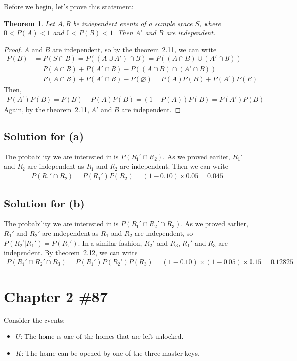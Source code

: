 \documentclass{scrartcl}
\newtheorem{theorem}{Theorem}
\begin{document}
Before we begin, let's prove this statement:
\begin{theorem}
  Let \(A, B\) be independent events of a sample space \(S\), where
  \(0 < P(A) < 1\) and \(0 < P(B) < 1\). Then \(A'\) and \(B\) are independent.
\end{theorem}
\begin{proof}
  \(A\) and \(B\) are independent, so by the theorem~2.11, we can write
  \begin{align*}
    P(B)
    &= P(S \cap B)
    = P((A \cup A') \cap B)
    = P((A \cap B) \cup (A' \cap B)) \\
    &= P(A \cap B) + P(A' \cap B) - P((A \cap B) \cap (A' \cap B)) \\
    &= P(A \cap B) + P(A' \cap B) - P(\varnothing)
    = P(A)P(B) + P(A')P(B)
  \end{align*}
  Then,
  \begin{align*}
    P(A')P(B) = P(B) - P(A)P(B) = (1 - P(A))P(B) = P(A')P(B)
  \end{align*}
  Again, by the theorem~2.11, \(A'\) and \(B\) are independent.
\end{proof}

\subsection{Solution for (a)}
The probability we are interested in is \(P(R_1' \cap R_2)\). As we proved
earlier, \(R_1'\) and \(R_2\) are independent as \(R_1\) and \(R_2\) are
independent. Then we can write
\begin{align*}
  P(R_1' \cap R_2) = P(R_1')P(R_2) = (1 - 0.10) \times 0.05 = 0.045
\end{align*}

\subsection{Solution for (b)}
The probability we are interested in is \(P(R_1' \cap R_2' \cap R_3)\). As we
proved earlier, \(R_1'\) and \(R_2'\) are independent as \(R_1\) and \(R_2\)
are independent, so \(P(R_2' | R_1') = P(R_2')\). In a similar fashion,
\(R_2'\) and \(R_3\), \(R_1'\) and \(R_3\) are independent. By theorem~2.12, we
can write
\begin{align*}
  P(R_1' \cap R_2' \cap R_3) = P(R_1')P(R_2')P(R_3) = (1 - 0.10) \times (1 - 0.05) \times 0.15 = 0.12825
\end{align*}

\section{Chapter 2 \#87}
Consider the events:
\begin{itemize}
  \item \(U\): The home is one of the homes that are left unlocked.
  \item \(K\): The home can be opened by one of the three master keys.
\end{itemize}
\end{document}
